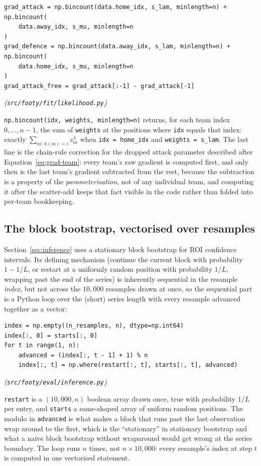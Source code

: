 \documentclass[11pt,a4paper]{article}
\begin{document}
\begin{appendices}
\begin{lstlisting}
grad_attack = np.bincount(data.home_idx, s_lam, minlength=n) + np.bincount(
    data.away_idx, s_mu, minlength=n
)
grad_defence = np.bincount(data.away_idx, s_lam, minlength=n) + np.bincount(
    data.home_idx, s_mu, minlength=n
)
grad_attack_free = grad_attack[:-1] - grad_attack[-1]
\end{lstlisting}
\emph{(\texttt{src/footy/fit/likelihood.py})}

\texttt{np.bincount(idx, weights, minlength=n)} returns, for each team index
$0,\dots,n-1$, the sum of \texttt{weights} at the positions where
\texttt{idx} equals that index: exactly $\sum_{m:\,h(m)=i} s^\lambda_m$
when \texttt{idx = home\_idx} and \texttt{weights = s\_lam}. The last line is
the chain-rule correction for the dropped attack parameter described after
Equation~\eqref{eq:grad-team}: every team's raw gradient is computed first,
and only then is the last team's gradient subtracted from the rest, because
the subtraction is a property of the \emph{parameterisation}, not of any
individual team, and computing it after the scatter-add keeps that fact
visible in the code rather than folded into per-team bookkeeping.

\subsection{The block bootstrap, vectorised over resamples}

Section~\ref{sec:inference} uses a stationary block bootstrap
\citep{politis1994} for ROI confidence intervals. Its defining mechanism
(continue the current block with probability $1 - 1/L$, or restart at a
uniformly random position with probability $1/L$, wrapping past the end of
the series) is inherently sequential in the resample \emph{index}, but not
across the $10{,}000$ resamples drawn at once, so the sequential part is a
Python loop over the (short) series length with every resample advanced
together as a vector:

\begin{lstlisting}
index = np.empty((n_resamples, n), dtype=np.int64)
index[:, 0] = starts[:, 0]
for t in range(1, n):
    advanced = (index[:, t - 1] + 1) % n
    index[:, t] = np.where(restart[:, t], starts[:, t], advanced)
\end{lstlisting}
\emph{(\texttt{src/footy/eval/inference.py})}

\texttt{restart} is a $(10{,}000, n)$ boolean array drawn once, true with
probability $1/L$ per entry, and \texttt{starts} a same-shaped array of
uniform random positions. The modulo in \texttt{advanced} is what makes a
block that runs past the last observation wrap around to the first, which is
the ``stationary'' in stationary bootstrap and what a naive block bootstrap
without wraparound would get wrong at the series boundary. The loop runs $n$
times, not $n \times 10{,}000$: every resample's index at step $t$ is
computed in one vectorised statement.


\end{appendices}
\end{document}
